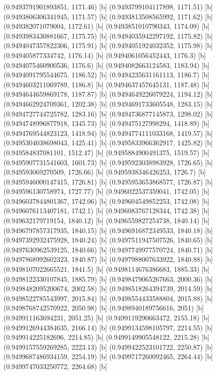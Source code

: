 {{{(0.9493791901893851, 1171.46) [b] 
(0.9493799104117898, 1171.51) [b] 
(0.9493806306341945, 1171.57) [b] 
(0.9493813508565992, 1171.62) [b] 
(0.949382071079004, 1172.61) [b] 
(0.9493851010790343, 1174.09) [b] 
(0.9493983430881667, 1175.75) [b] 
(0.9494035942297192, 1175.82) [b] 
(0.9494047357822306, 1175.91) [b] 
(0.9494051924032352, 1175.98) [b] 
(0.949405877334742, 1176.14) [b] 
(0.9494061056452443, 1176.3) [b] 
(0.9494075460900536, 1176.6) [b] 
(0.9494082663124583, 1183.94) [b] 
(0.9494091795544675, 1186.52) [b] 
(0.9494235631161113, 1186.7) [b] 
(0.9494603211069789, 1186.8) [b] 
(0.9494637457645131, 1187.48) [b] 
(0.9494644659869178, 1187.87) [b] 
(0.9494649226079224, 1194.12) [b] 
(0.9494662924709361, 1202.38) [b] 
(0.9494691733605548, 1283.15) [b] 
(0.9494727744725782, 1283.16) [b] 
(0.9494736877145873, 1298.02) [b] 
(0.9494748996877918, 1345.73) [b] 
(0.949475127998294, 1418.89) [b] 
(0.9494769544823123, 1418.94) [b] 
(0.9494774111033168, 1419.57) [b] 
(0.9495304038698043, 1425.41) [b] 
(0.9495833966362917, 1425.82) [b] 
(0.949584837081101, 1512.47) [b] 
(0.9495884900491375, 1519.57) [b] 
(0.9495907731541603, 1601.73) [b] 
(0.9495923038983928, 1726.65) [b] 
(0.949593069270509, 1726.66) [b] 
(0.9495938346426253, 1726.7) [b] 
(0.9495946000147415, 1726.81) [b] 
(0.9495953653868577, 1726.87) [b] 
(0.949596130758974, 1727.77) [b] 
(0.9496022537359041, 1742.05) [b] 
(0.9496037844801367, 1742.06) [b] 
(0.949604549852253, 1742.08) [b] 
(0.9496076113407181, 1742.1) [b] 
(0.9496083767128344, 1742.38) [b] 
(0.949632179719154, 1840.12) [b] 
(0.9496559827254738, 1840.14) [b] 
(0.9496797857317935, 1840.15) [b] 
(0.9496916872349533, 1840.18) [b] 
(0.9497392932475928, 1840.24) [b] 
(0.9497511947507526, 1840.65) [b] 
(0.9497630962539125, 1840.66) [b] 
(0.9497749977570724, 1840.71) [b] 
(0.9497868992602323, 1840.87) [b] 
(0.9497988007633922, 1840.88) [b] 
(0.9498107022665521, 1841.5) [b] 
(0.9498114676386683, 1885.33) [b] 
(0.9498122330107845, 1885.79) [b] 
(0.9498479065267663, 2000.36) [b] 
(0.9498482095200674, 2002.58) [b] 
(0.9498518264394739, 2014.59) [b] 
(0.9498522785543997, 2015.84) [b] 
(0.9498554433588804, 2015.88) [b] 
(0.9498768742570922, 2050.98) [b] 
(0.9498940189756616, 2051) [b] 
(0.949911163694231, 2051.25) [b] 
(0.9499119290663472, 2155.18) [b] 
(0.9499126944384635, 2166.14) [b] 
(0.9499134598105797, 2214.55) [b] 
(0.949914225182696, 2214.85) [b] 
(0.9499149905548122, 2215.28) [b] 
(0.9499157559269285, 2223.13) [b] 
(0.9499422523101722, 2250.87) [b] 
(0.9499687486934159, 2254.19) [b] 
(0.9499717260092465, 2264.44) [b] 
(0.9499747033250772, 2264.68) [b] 
}}}
